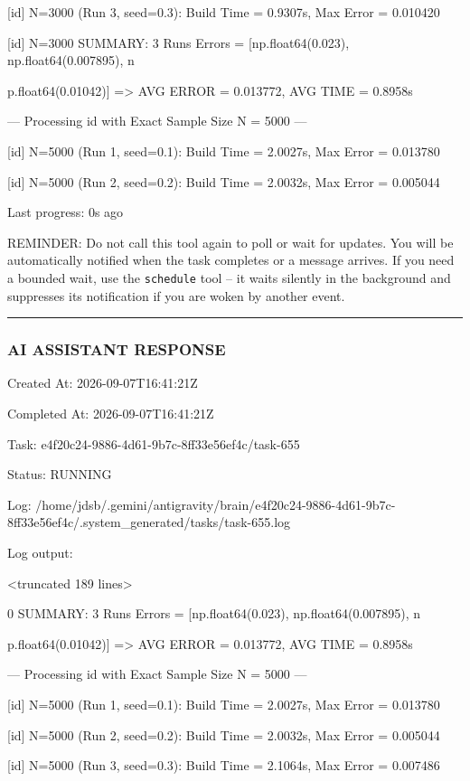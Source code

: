 \documentclass[11pt,a4paper]{article}
\begin{document}
[id] N=3000 (Run 3, seed=0.3): Build Time = 0.9307s, Max Error = 0.010420

[id] N=3000 SUMMARY: 3 Runs Errors = [np.float64(0.023), np.float64(0.007895), n

p.float64(0.01042)] => AVG ERROR = 0.013772, AVG TIME = 0.8958s

--- Processing id with Exact Sample Size N = 5000 ---

[id] N=5000 (Run 1, seed=0.1): Build Time = 2.0027s, Max Error = 0.013780

[id] N=5000 (Run 2, seed=0.2): Build Time = 2.0032s, Max Error = 0.005044


Last progress: 0s ago



REMINDER: Do not call this tool again to poll or wait for updates. You will be automatically notified when the task completes or a message arrives. If you need a bounded wait, use the \texttt{schedule} tool -- it waits silently in the background and suppresses its notification if you are woken by another event.


\hrule

\subsubsection{AI ASSISTANT RESPONSE}

Created At: 2026-09-07T16:41:21Z

Completed At: 2026-09-07T16:41:21Z

Task: e4f20c24-9886-4d61-9b7c-8ff33e56ef4c/task-655

Status: RUNNING

Log: /home/jdsb/.gemini/antigravity/brain/e4f20c24-9886-4d61-9b7c-8ff33e56ef4c/.system\_generated/tasks/task-655.log

Log output:

<truncated 189 lines>

0 SUMMARY: 3 Runs Errors = [np.float64(0.023), np.float64(0.007895), n

p.float64(0.01042)] => AVG ERROR = 0.013772, AVG TIME = 0.8958s

--- Processing id with Exact Sample Size N = 5000 ---

[id] N=5000 (Run 1, seed=0.1): Build Time = 2.0027s, Max Error = 0.013780

[id] N=5000 (Run 2, seed=0.2): Build Time = 2.0032s, Max Error = 0.005044

[id] N=5000 (Run 3, seed=0.3): Build Time = 2.1064s, Max Error = 0.007486
\end{document}
